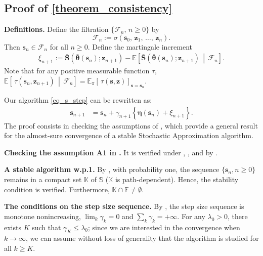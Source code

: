 \documentclass{article}
\newcommand{\nn}{\nonumber} %
\def\eqdef{:=}
\def\param{\vtheta}
\def\barparam{\bar{\param}}
\def\bars{\bar{\vS}}
\def\rvz{{\mathbf{z}}}
\def\veta{{\bm{\eta}}}
\def\vtheta{{\bm{\theta}}}
\def\vs{{\bm{s}}}
\def\vS{{\bm{S}}}
\def\vz{{\bm{z}}}
\def\sF{{\mathbb{F}}}
\def\sS{{\mathbb{S}}}
\begin{document}
\subsection{Proof of \texorpdfstring{\cref{theorem_consistency}}{Theorem \ref*{theorem_consistency}}} \label{proof_proposition_consistency}
{\bf Definitions.} Define the filtration \(\{\mathcal{F}_n,\, n \ge 0\}\) by
\[
\mathcal{F}_n \eqdef \sigma(\vs_0,\, \rvz_1,\, \ldots,\, \rvz_n).
\]
Then \(\vs_n \in \mathcal{F}_n\) for all \(n \ge 0\).  
Define the martingale increment 
\begin{align}
\xi_{n+1}\eqdef\bars\left(\barparam\left(\vs_n\right);\vz_{n+1}\right)-\mathbb{E}\left[ \bars\left(\barparam\left(\vs_n\right);\rvz_{n+1}\right)\,\middle|\, \mathcal{F}_n \right].\nn
    \end{align} Note that for any positive measurable function \(\tau\), $\mathbb{E}\!\left[\, \tau(\vs_n, \rvz_{n+1}) \,\middle|\, \mathcal{F}_n \right]
= \mathbb{E}_{\pi}\!\left[\, \tau(\vs, \rvz) \right]_{\vs = \vs_n}$.   \par Our algorithm \cref{eq_s_step} can be rewritten as:
    \begin{align} \label{s_step_with_eps}
        \vs_{n+1} & =\vs_{n}+\gamma_{n+1}\left\{ \veta(\vs_n)+\xi_{n+1}\right\}.
    \end{align} The proof consists in checking the assumptions of \cite[Theorem 2.3]{andrieu_stability_2005}, which provide a general result for the almost-sure convergence of a stable Stochastic Approximation algorithm.

{\bf Checking the assumption A1 in \cite{andrieu_stability_2005}.}  It is verified under  , ,    and 
by .

{\bf A stable algorithm w.p.1.} By , with probability one,  the sequence $\{\vs_n, n \geq 0\}$ remains in a compact set $\mathbb{K}$ of $\sS$ ($\mathbb{K}$ is path-dependent). Hence, the stability condition is verified. Furthermore,  $\mathbb{K} \cap \sF \neq \emptyset$.

{\bf The conditions on the step size sequence.} By , the step size sequence is monotone nonincreasing, $\lim_k \gamma_k = 0$ and $\sum_k \gamma_k = +\infty$. For any $\lambda_0>0$, there exists $K$  such that $\gamma_K \leq \lambda_0$; since we are interested in the convergence when $k \to \infty$, we can assume without loss of generality that the algorithm is studied for all $k \geq K$. 
\end{document}
